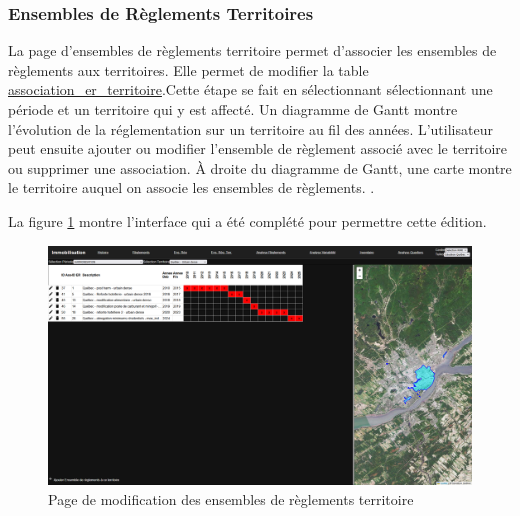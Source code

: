 \subsubsection{Ensembles de Règlements Territoires}
La page d'ensembles de règlements territoire permet d'associer les ensembles de règlements aux territoires. Elle permet de modifier la table \ul{association\_er\_territoire}.Cette étape se fait en sélectionnant sélectionnant une période et un territoire qui y est affecté. Un diagramme de Gantt montre l'évolution de la réglementation sur un territoire au fil des années. L'utilisateur peut ensuite ajouter ou modifier l'ensemble de règlement associé avec le territoire ou supprimer une association. À droite du diagramme de Gantt, une carte montre le territoire auquel on associe les ensembles de règlements. .\par
La figure \ref{fig:page-ens-reg-terr} montre l'interface qui a été complété pour permettre cette édition.
\begin{landscape}
    \begin{figure}
        \centering
        \includegraphics[width=1\linewidth]{images/PageEnsRegTerr.png}
        \caption{Page de modification des ensembles de règlements territoire}
        \label{fig:page-ens-reg-terr}
    \end{figure}
\end{landscape}

